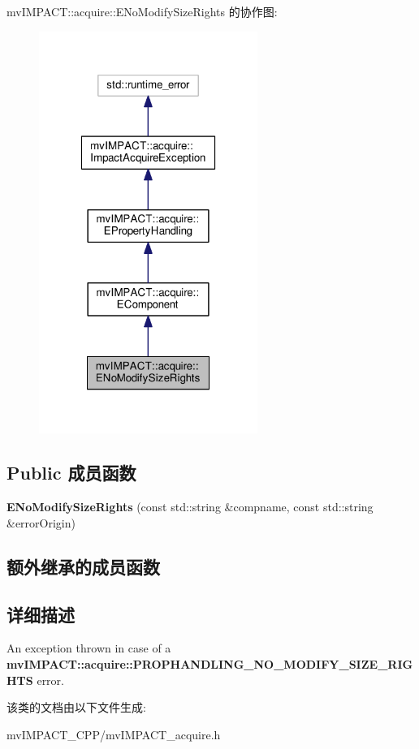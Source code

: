 mv\+I\+M\+P\+A\+C\+T\+:\+:acquire\+:\+:E\+No\+Modify\+Size\+Rights 的协作图\+:
\nopagebreak
\begin{figure}[H]
\begin{center}
\leavevmode
\includegraphics[width=202pt]{classmv_i_m_p_a_c_t_1_1acquire_1_1_e_no_modify_size_rights__coll__graph}
\end{center}
\end{figure}
\subsection*{Public 成员函数}
\begin{DoxyCompactItemize}
\item 
\hypertarget{classmv_i_m_p_a_c_t_1_1acquire_1_1_e_no_modify_size_rights_a74032155883afd027f71e7b16970c827}{{\bfseries E\+No\+Modify\+Size\+Rights} (const std\+::string \&compname, const std\+::string \&error\+Origin)}\label{classmv_i_m_p_a_c_t_1_1acquire_1_1_e_no_modify_size_rights_a74032155883afd027f71e7b16970c827}

\end{DoxyCompactItemize}
\subsection*{额外继承的成员函数}


\subsection{详细描述}
An exception thrown in case of a {\bfseries mv\+I\+M\+P\+A\+C\+T\+::acquire\+::\+P\+R\+O\+P\+H\+A\+N\+D\+L\+I\+N\+G\+\_\+\+N\+O\+\_\+\+M\+O\+D\+I\+F\+Y\+\_\+\+S\+I\+Z\+E\+\_\+\+R\+I\+G\+H\+T\+S} error. 

该类的文档由以下文件生成\+:\begin{DoxyCompactItemize}
\item 
mv\+I\+M\+P\+A\+C\+T\+\_\+\+C\+P\+P/mv\+I\+M\+P\+A\+C\+T\+\_\+acquire.\+h\end{DoxyCompactItemize}
